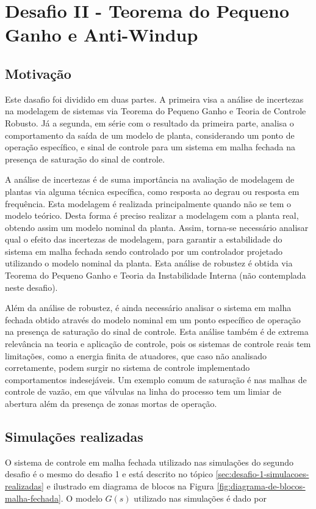 \section{Desafio II - Teorema do Pequeno Ganho e Anti-Windup} 
 
\subsection{Motivação}
Este dasafio foi dividido em duas partes. A primeira visa a análise de
incertezas na modelagem de sistemas via Teorema do Pequeno Ganho e Teoria de
Controle Robusto. Já a segunda, em série com o resultado da primeira parte,
analisa o comportamento da saída de um modelo de planta, considerando um ponto
de operação específico, e sinal de controle para um sistema em malha fechada na
presença de saturação do sinal de controle.

A análise de incertezas é de suma importância na avaliação de modelagem de plantas
via alguma técnica específica, como resposta ao degrau ou resposta em
frequência. Esta modelagem é realizada principalmente quando não se tem o modelo
teórico. Desta forma é preciso realizar a modelagem com a planta real, obtendo
assim um modelo nominal da planta. Assim, torna-se necessário analisar qual o
efeito das incertezas de modelagem, para garantir a estabilidade do sistema em
malha fechada sendo controlado por um controlador projetado utilizando o modelo
nominal da planta. Esta análise de robustez é obtida via Teorema do Pequeno
Ganho e Teoria da Instabilidade Interna (não contemplada neste desafio).

Além da análise de robustez, é ainda necessário analisar o sistema em malha
fechada obtido através do modelo nominal em um ponto específico de operação na
presença de saturação do sinal de controle. Esta análise também é de extrema
relevância na teoria  e aplicação de controle, pois os sistemas de controle
reais tem limitações, como a energia finita de atuadores, que caso não analisado
corretamente, podem surgir no sistema de controle implementado comportamentos
indesejáveis. Um exemplo comum de saturação é nas malhas de controle de vazão,
em que válvulas na linha do processo tem um limiar de abertura além da presença
de zonas mortas de operação.

\subsection{Simulações realizadas}
O sistema de controle em malha fechada utilizado nas simulações do segundo
desafio é o mesmo do desafio 1 e está descrito no tópico
\ref{sec:desafio-1-simulacoes-realizadas} e ilustrado em diagrama de blocos na
Figura \ref{fig:diagrama-de-blocos-malha-fechada}. O modelo $G(s)$ utilizado nas
simulações é dado por


